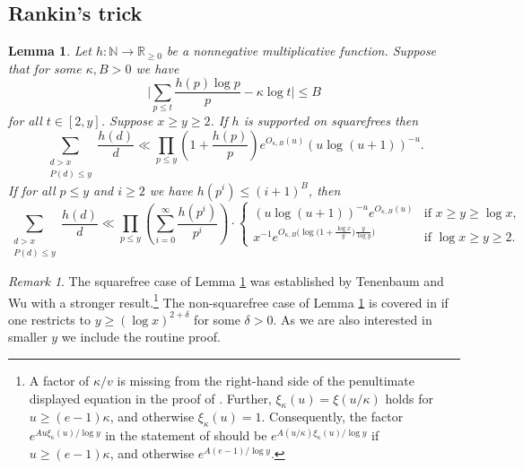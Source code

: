 \documentclass{article}
\theoremstyle{plain}
\newtheorem{lem}[thm]{Lemma}
\theoremstyle{remark}
\newtheorem{rem}{Remark}[section]
\newcommand{\RR}{\mathbb{R}}
\newcommand{\NN}{\mathbb{N}}
\numberwithin{equation}{section}
\begin{document}
\subsection{Rankin's trick}
\begin{lem}\label{lem:rankin}
Let $h\colon \NN\to \RR_{\ge 0}$ be a nonnegative multiplicative function. Suppose that for some $\kappa,B> 0$ we have
	\begin{equation}\label{eq:mertensk}
		\bigg|\sum_{p\le t} \frac{h(p)\log p}{p}-\kappa \log t\bigg|\le B
	\end{equation}
	for all $t \in [2,y]$. Suppose $x\ge y \ge 2$. If $h$ is supported on squarefrees then
	\[ \sum_{\substack{d>x\\ P(d)\le y}} \frac{h(d)}{d} \ll \prod_{p\le y}\left(1+\frac{h(p)}{p}\right) e^{O_{\kappa,B}(u)}  (u\log (u+1))^{-u}. \]
	If for all $p\le y$ and $i\ge 2$ we have $h(p^i)\le (i+1)^B$, then
	\[ \sum_{\substack{d>x\\ P(d)\le y}} \frac{h(d)}{d} \ll  \prod_{p\le y}\left(\sum_{i=0}^{\infty}\frac{h(p^i)}{p^i}\right)\cdot  \begin{cases}  (u\log (u+1))^{-u}e^{O_{\kappa,B}(u)} &\text{if }x\ge y \ge \log x,\\ x^{-1} e^{O_{\kappa,B}\big(\log \big(1+\tfrac{\log x}{y}\big)\tfrac{y}{\log y}\big)} &\text{if }\log x \ge y \ge 2.\end{cases}\]
\end{lem}
\begin{rem}
	The squarefree case of Lemma \ref{lem:rankin} was established by Tenenbaum and Wu \cite[Lem.~6.1]{TenenbaumWu} with a stronger result.\footnote{A factor of $\kappa/v$ is missing from the right-hand side of the penultimate displayed equation in the proof of \cite[Lem.~6.1]{TenenbaumWu}. Further, $\xi_{\kappa}(u)=\xi(u/\kappa)$ holds for $u\ge (e-1)\kappa$, and otherwise $\xi_{\kappa}(u)=1$. Consequently, the factor $e^{Au\xi_{\kappa}(u)/\log y}$ in the statement of \cite[Lem.~6.1]{TenenbaumWu} should  be $e^{A(u/\kappa)\xi_{\kappa}(u)/\log y}$ if $u\ge (e-1)\kappa$, and otherwise $e^{A(e-1)/\log y}$.} The non-squarefree case of Lemma \ref{lem:rankin} is covered in \cite[Lem.~6.1]{TenenbaumWu} if one restricts to $y\ge (\log x)^{2+\delta}$ for some $\delta>0$. As we are also interested in smaller $y$ we include the routine proof.
\end{rem}
\end{document}
